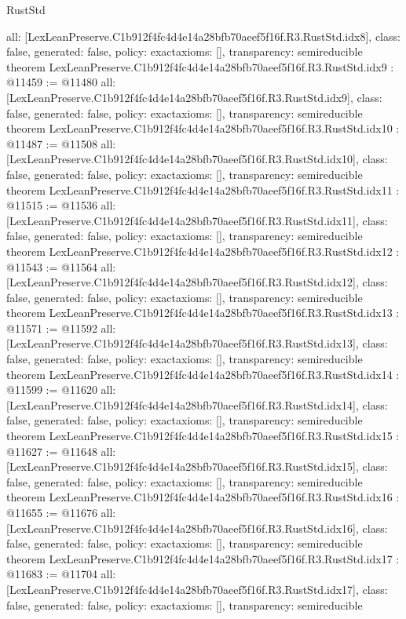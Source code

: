 \begin{lexlean}{RustStd}
\begin{coremodule}
{  all: [LexLeanPreserve.C1b912f4fc4d4e14a28bfb70aeef5f16f.R3.RustStd.idx8],
  class: false,
  generated: false,
  policy: exact{axioms: []},
  transparency: semireducible
}
theorem LexLeanPreserve.C1b912f4fc4d4e14a28bfb70aeef5f16f.R3.RustStd.idx9 : @11459 := @11480 {
  all: [LexLeanPreserve.C1b912f4fc4d4e14a28bfb70aeef5f16f.R3.RustStd.idx9],
  class: false,
  generated: false,
  policy: exact{axioms: []},
  transparency: semireducible
}
theorem LexLeanPreserve.C1b912f4fc4d4e14a28bfb70aeef5f16f.R3.RustStd.idx10 : @11487 := @11508 {
  all: [LexLeanPreserve.C1b912f4fc4d4e14a28bfb70aeef5f16f.R3.RustStd.idx10],
  class: false,
  generated: false,
  policy: exact{axioms: []},
  transparency: semireducible
}
theorem LexLeanPreserve.C1b912f4fc4d4e14a28bfb70aeef5f16f.R3.RustStd.idx11 : @11515 := @11536 {
  all: [LexLeanPreserve.C1b912f4fc4d4e14a28bfb70aeef5f16f.R3.RustStd.idx11],
  class: false,
  generated: false,
  policy: exact{axioms: []},
  transparency: semireducible
}
theorem LexLeanPreserve.C1b912f4fc4d4e14a28bfb70aeef5f16f.R3.RustStd.idx12 : @11543 := @11564 {
  all: [LexLeanPreserve.C1b912f4fc4d4e14a28bfb70aeef5f16f.R3.RustStd.idx12],
  class: false,
  generated: false,
  policy: exact{axioms: []},
  transparency: semireducible
}
theorem LexLeanPreserve.C1b912f4fc4d4e14a28bfb70aeef5f16f.R3.RustStd.idx13 : @11571 := @11592 {
  all: [LexLeanPreserve.C1b912f4fc4d4e14a28bfb70aeef5f16f.R3.RustStd.idx13],
  class: false,
  generated: false,
  policy: exact{axioms: []},
  transparency: semireducible
}
theorem LexLeanPreserve.C1b912f4fc4d4e14a28bfb70aeef5f16f.R3.RustStd.idx14 : @11599 := @11620 {
  all: [LexLeanPreserve.C1b912f4fc4d4e14a28bfb70aeef5f16f.R3.RustStd.idx14],
  class: false,
  generated: false,
  policy: exact{axioms: []},
  transparency: semireducible
}
theorem LexLeanPreserve.C1b912f4fc4d4e14a28bfb70aeef5f16f.R3.RustStd.idx15 : @11627 := @11648 {
  all: [LexLeanPreserve.C1b912f4fc4d4e14a28bfb70aeef5f16f.R3.RustStd.idx15],
  class: false,
  generated: false,
  policy: exact{axioms: []},
  transparency: semireducible
}
theorem LexLeanPreserve.C1b912f4fc4d4e14a28bfb70aeef5f16f.R3.RustStd.idx16 : @11655 := @11676 {
  all: [LexLeanPreserve.C1b912f4fc4d4e14a28bfb70aeef5f16f.R3.RustStd.idx16],
  class: false,
  generated: false,
  policy: exact{axioms: []},
  transparency: semireducible
}
theorem LexLeanPreserve.C1b912f4fc4d4e14a28bfb70aeef5f16f.R3.RustStd.idx17 : @11683 := @11704 {
  all: [LexLeanPreserve.C1b912f4fc4d4e14a28bfb70aeef5f16f.R3.RustStd.idx17],
  class: false,
  generated: false,
  policy: exact{axioms: []},
  transparency: semireducible
}

\end{coremodule}
\end{lexlean}

